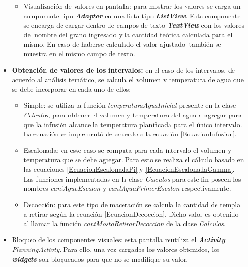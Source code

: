 \begin{itemize}
\begin{itemize}
                        \item Visualización de valores en pantalla: para mostrar los valores se carga un componente tipo \textbf{ \textit{\gls{Adapter}}} en una lista tipo \textbf{\textit{\gls{ListView}}}. Este componente se encarga de cargar dentro de campos de texto \textbf{\textit{\gls{TextView}}} con los valores del nombre del grano ingresado y la cantidad teórica calculada para el mismo. En caso de haberse calculado el valor ajustado, también se muestra en el mismo campo de texto.
                    \end{itemize}
                
                \item \textbf{Obtención de valores de los intervalos:}
                    en el caso de los intervalos, de acuerdo al análisis temático, se calcula el volumen y temperatura de agua que se debe incorporar en cada uno de ellos:
                    \begin{itemize}
                        \item Simple: se utiliza la función \textit{temperaturaAguaInicial} presente en la clase \textit{Calculos}, para obtener el volumen y temperatura del agua a agregar para que la infusión alcance la temperatura planificada para el único intervalo. La ecuación se implementó de acuerdo a la ecuación \ref{EcuacionInfusion}.
                    
                        \item Escalonada: en este caso se computa para cada intervalo el volumen y temperatura que se debe agregar. Para esto se realiza el cálculo basado en las ecuaciones \ref{EcuacionEscalonadaPi} y \ref{EcuacionEscalonadaGamma}. Las funciones implementadas en la clase \textit{Calculos} para este fin poseen los nombres \textit{cantAguaEscalon} y \textit{cantAguaPrimerEscalon} respectivamente.
                    
                        \item Decocción: para este tipo de maceración se calcula la cantidad de templa a retirar según la ecuación \ref{EcuacionDecoccion}. Dicho valor es obtenido al llamar la función \textit{cantMostoRetirarDecoccion} de la clase \textit{Calculos}.
                    \end{itemize}
                    
                    \item Bloqueo de los componentes visuales: esta pantalla reutiliza el \textbf{\textit{Activity}} \textit{PlanningActivty}. Para ello, una vez cargados los valores obtenidos, los \textbf{\textit{\gls{widget}s}} son bloqueados para que no se modifique su valor.

            \end{itemize}
            
